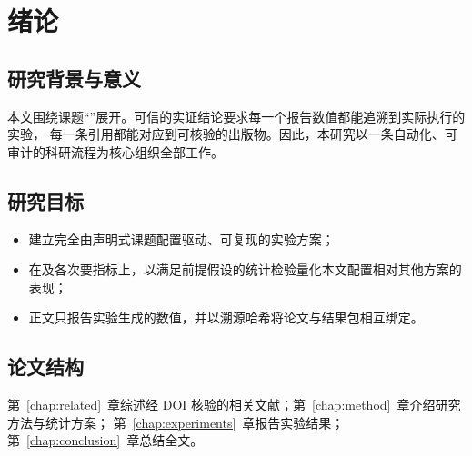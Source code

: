 \chapter{绪论}
\label{chap:intro}

\section{研究背景与意义}
本文围绕课题“\ThesisTitle”展开。可信的实证结论要求每一个报告数值都能追溯到实际执行的实验，
每一条引用都能对应到可核验的出版物。因此，本研究以一条自动化、可审计的科研流程为核心组织全部工作。

\section{研究目标}
\begin{itemize}
  \item 建立完全由声明式课题配置驱动、可复现的实验方案；
  \item 在\MetricPrimaryName{}及各次要指标上，以满足前提假设的统计检验量化本文配置相对其他方案的表现；
  \item 正文只报告实验生成的数值，并以溯源哈希将论文与结果包相互绑定。
\end{itemize}

\section{论文结构}
第~\ref{chap:related}~章综述经 DOI 核验的相关文献；第~\ref{chap:method}~章介绍研究方法与统计方案；
第~\ref{chap:experiments}~章报告实验结果；第~\ref{chap:conclusion}~章总结全文。
